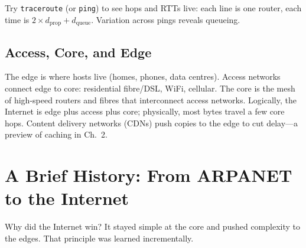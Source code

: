 Try \texttt{traceroute} (or \texttt{ping}) to see hops and RTTs live: each line is one router, each time is $2\times d_{\text{prop}}+d_{\text{queue}}$. Variation across pings reveals queueing.

\subsection{Access, Core, and Edge}
The edge is where hosts live (homes, phones, data centres). Access networks connect edge to core: residential fibre/DSL, WiFi, cellular. The core is the mesh of high-speed routers and fibres that interconnect access networks. Logically, the Internet is edge plus access plus core; physically, most bytes travel a few core hops. Content delivery networks (CDNs) push copies to the edge to cut delay---a preview of caching in Ch.~2.

\section{A Brief History: From ARPANET to the Internet}
\label{sec:history}
Why did the Internet win? It stayed simple at the core and pushed complexity to the edges. That principle was learned incrementally.

